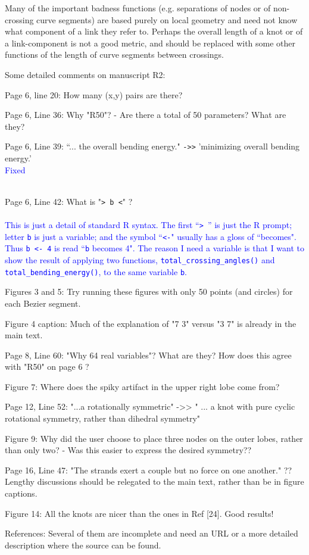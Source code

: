 \documentclass[12pt]{article}
\begin{document}
Many of the important badness functions (e.g. separations of nodes or
of non-crossing curve segments) are based purely on local geometry and
need not know what component of a link they refer to.  Perhaps the
overall length of a knot or of a link-component is not a good metric,
and should be replaced with some other functions of the length of
curve segments between crossings.

Some detailed comments on manuscript R2:

Page 6, line 20:  How many (x,y) pairs are there?

Page 6, Line 36: Why "R50"? - Are there a total of 50 parameters?
What are they?

Page 6, Line 39: ``... the overall bending energy." {\tt ->>} 'minimizing
overall bending energy.'
\textcolor{blue}{\\Fixed\\ \\}

Page 6, Line 42:  What is "{\tt > b <}" ?
\\ \\
\textcolor{blue}{This is just a detail of standard R syntax.  The
  first ``{\tt > }'' is just the R prompt; letter {\tt b} is just a
  variable; and the symbol ``{\tt <-}" usually has a gloss of
  ``becomes".  Thus {\tt b <- 4} is read ``{\tt b} becomes 4". The
  reason I need a variable is that I want to show the result of
  applying two functions, {\tt total\_crossing\_angles()} and {\tt
    total\_bending\_energy()}, to the same variable {\tt b}.}


Figures 3 and 5: Try running these figures with only 50 points (and
circles) for each Bezier segment.

Figure 4 caption: Much of the explanation of "7 3" versus "3 7" is
already in the main text.

Page 8, Line 60: "Why 64 real variables"?  What are they?  How does
this agree with "R50" on page 6 ?

Figure 7:  Where does the spiky artifact in the upper right lobe come from?

Page 12, Line 52: "...a rotationally symmetric" ->> " ... a knot with
pure cyclic rotational symmetry, rather than dihedral symmetry"

Figure 9: Why did the user choose to place three nodes on the outer
lobes, rather than only two? - Was this easier to express the desired
symmetry??

Page 16, Line 47: "The strands exert a couple but no force on one
another." ??  Lengthy discussions should be relegated to the main
text, rather than be in figure captions.

Figure 14: All the knots are nicer than the ones in Ref [24].  Good
results!

References: Several of them are incomplete and need an URL or a more
detailed description where the source can be found.
\end{document}
